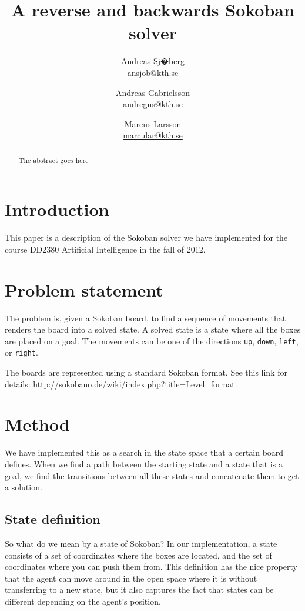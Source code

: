 \documentclass[a4paper,11pt]{article}
\title{A reverse and backwards Sokoban solver \\ }
\author{Andreas Sj�berg \\ \url{ansjob@kth.se} 
		\and Andreas Gabrielsson \\ \url{andregus@kth.se} 
		\and Marcus Larsson \\ \url{marcular@kth.se}
	}
\begin{document}
\thispagestyle{plain}
\maketitle

\begin{abstract}
The abstract goes here
\end{abstract}

\clearpage

\tableofcontents

\clearpage

\section{Introduction}
This paper is a description of the Sokoban solver we have implemented for the course
DD2380 Artificial Intelligence in the fall of 2012.

\section{Problem statement}

The problem is, given a Sokoban board, to find a sequence of movements that renders the
board into a solved state.
A solved state is a state where all the boxes are placed on a goal.
The movements can be one of the directions \verb!up!, \verb!down!, \verb!left!, or \verb!right!.

The boards are represented using a standard Sokoban format. See this link for details:
\url{http://sokobano.de/wiki/index.php?title=Level_format}.


\section{Method}

We have implemented this as a search in the state space that a certain board defines.
When we find a path between the starting state and a state that is a goal,
we find the transitions between all these states and concatenate them to get a solution.

\subsection{State definition}

So what do we mean by a state of Sokoban?
In our implementation, a state consists of a set of coordinates where the boxes are located,
and the set of coordinates where you can push them from.
This definition has the nice property that the agent can move around in the
open space where it is without transferring to a new state,
but it also captures the fact that states can be different depending on the agent's position.
\end{document}
